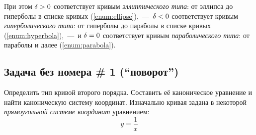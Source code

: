 \documentclass[a4paper,12pt]{article}
\begin{document}
  При этом $\delta \hm> 0$ соответствует кривым \emph{эллиптического типа}: от эллипса до гиперболы в списке кривых (\ref{enum:ellipse}),~---~$\delta \hm< 0$ соответствует кривым \emph{гиперболического типа}: от гиперболы до параболы в списке кривых (\ref{enum:hyperbola}),~---~и $\delta \hm= 0$ соответствует кривым \emph{параболического типа}: от параболы и далее (\ref{enum:parabola}).
  
  
  \subsection{Задача без номера \# 1 (``поворот'')}
  
  Определить тип кривой второго порядка.
  Составить её каноническое уравнение и найти каноническую систему координат.
  Изначально кривая задана в некоторой \emph{прямоугольной системе координат} уравнением:
  \begin{equation}\label{eq:problem-no-number}
    y = \frac{1}{x}
  \end{equation}
  
\end{document}

